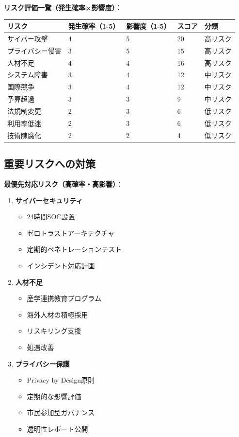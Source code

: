 \documentclass[
  a4paper,
  a4paper,
  11pt]{ltjsbook}
\providecommand{\tightlist}{%
  \setlength{\itemsep}{0pt}\setlength{\parskip}{0pt}}
\begin{document}
\textbf{リスク評価一覧（発生確率×影響度）}：

\begin{longtable}[]{@{}lllll@{}}
\toprule\noalign{}
リスク & 発生確率（1-5） & 影響度（1-5） & スコア & 分類 \\
\midrule\noalign{}
\endhead
\bottomrule\noalign{}
\endlastfoot
サイバー攻撃 & 4 & 5 & 20 & 高リスク \\
プライバシー侵害 & 3 & 5 & 15 & 高リスク \\
人材不足 & 4 & 4 & 16 & 高リスク \\
システム障害 & 3 & 4 & 12 & 中リスク \\
国際競争 & 3 & 4 & 12 & 中リスク \\
予算超過 & 3 & 3 & 9 & 中リスク \\
法規制変更 & 2 & 3 & 6 & 低リスク \\
利用率低迷 & 2 & 3 & 6 & 低リスク \\
技術陳腐化 & 2 & 2 & 4 & 低リスク \\
\end{longtable}

\subsection{重要リスクへの対策}\label{ux91cdux8981ux30eaux30b9ux30afux3078ux306eux5bfeux7b56}

\textbf{最優先対応リスク（高確率・高影響）}：

\begin{enumerate}
\def\labelenumi{\arabic{enumi}.}
\tightlist
\item
  \textbf{サイバーセキュリティ}

  \begin{itemize}
  \tightlist
  \item
    24時間SOC設置
  \item
    ゼロトラストアーキテクチャ
  \item
    定期的ペネトレーションテスト
  \item
    インシデント対応計画
  \end{itemize}
\item
  \textbf{人材不足}

  \begin{itemize}
  \tightlist
  \item
    産学連携教育プログラム
  \item
    海外人材の積極採用
  \item
    リスキリング支援
  \item
    処遇改善
  \end{itemize}
\item
  \textbf{プライバシー保護}

  \begin{itemize}
  \tightlist
  \item
    Privacy by Design原則
  \item
    定期的な影響評価
  \item
    市民参加型ガバナンス
  \item
    透明性レポート公開
  \end{itemize}
\end{enumerate}
\end{document}
